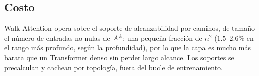 \subsection{Costo}

Walk Attention opera sobre el soporte de alcanzabilidad por caminos, de tamaño el
número de entradas no nulas de $A^{\,k}$: una pequeña fracción de $n^2$
($1.5$--$2.6\%$ en el rango más profundo, según la profundidad), por lo que la
capa es mucho más barata que
un Transformer denso sin perder largo alcance. Los soportes se
precalculan y cachean por topología, fuera del bucle de entrenamiento.
